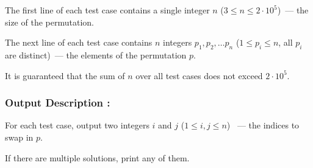 \documentclass{article}
\begin{document}
The first line of each test case contains a single integer $n$ ($3 \le n \le 2\cdot 10^5$) — the size of the permutation.

The next line of each test case contains $n$ integers $p_1, p_2, \ldots p_n$ ($1 \le p_i \le n$, all $p_i$ are distinct) — the elements of the permutation $p$.

It is guaranteed that the sum of $n$ over all test cases does not exceed $2\cdot 10^5$.
\paragraph{}
\subsubsection*{Output Description : }For each test case, output two integers $i$ and $j$ ($1 \le i, j \le n$)  — the indices to swap in $p$.

If there are multiple solutions, print any of them.
\end{document}
